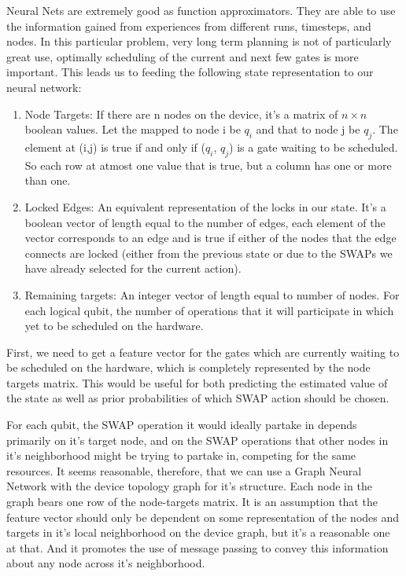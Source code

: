 \documentclass[%
 reprint,
 longbibliography,
 amsmath,amssymb,
 aps,
]{revtex4-2}
\begin{document}
Neural Nets are extremely good as function approximators. They are able to use the information gained from experiences from different runs, timesteps, and nodes. In this particular problem, very long term planning is not of particularly great use, optimally scheduling of the current and next few gates is more important. This leads us to feeding the following state representation to our neural network:
\begin{enumerate}
    \item Node Targets: If there are n nodes on the device, it's a matrix of $n \times n$ boolean values. Let the mapped to node i be $q_i$ and that to node j be $q_j$. The element at (i,j) is true if and only if ($q_i$, $q_j$) is a gate waiting to be scheduled. So each row at atmost one value that is true, but a column has one or more than one.
    \item Locked Edges: An equivalent representation of the locks in our state. It's a boolean vector of length equal to the number of edges, each element of the vector corresponds to an edge and is true if either of the nodes that the edge connects are locked (either from the previous state or due to the SWAPs we have already selected for the current action).
    \item Remaining targets: An integer vector of length equal to number of nodes. For each logical qubit, the number of operations that it will participate in which yet to be scheduled on the hardware.
\end{enumerate}

First, we need to get a feature vector for the gates which are currently waiting to be scheduled on the hardware, which is completely represented by the node targets matrix. This would be useful for both predicting the estimated value of the state as well as prior probabilities of which SWAP action should be chosen.

For each qubit, the SWAP operation it would ideally partake in depends primarily on it's target node, and on the SWAP operations that other nodes in it's neighborhood might be trying to partake in, competing for the same resources. It seems reasonable, therefore, that we can use a Graph Neural Network with the device topology graph for it's structure. Each node in the graph bears one row of the node-targets matrix. It is an assumption that the feature vector should only be dependent on some representation of the nodes and targets in it's local neighborhood on the device graph, but it's a reasonable one at that. And it promotes the use of message passing to convey this information about any node across it's neighborhood.
\end{document}
